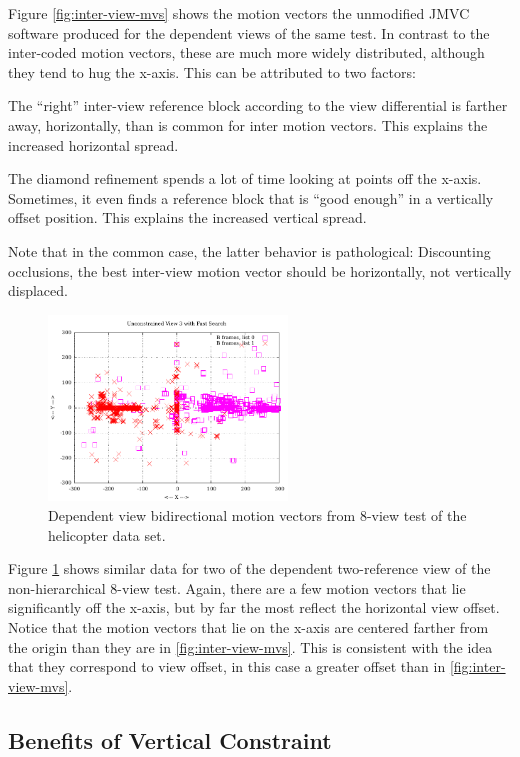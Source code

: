 \documentclass{sig-alternate-05-2015}
\begin{document}
Figure \ref{fig:inter-view-mvs} shows the motion vectors the unmodified JMVC
software produced for the dependent views of the same test. In contrast to the
inter-coded motion vectors, these are much more widely distributed, although
they tend to hug the x-axis. This can be attributed to two factors:
\begin{compactenum}
\item The ``right'' inter-view reference block according to the view
differential is farther away, horizontally, than is common for inter motion
vectors. This explains the increased horizontal spread.
\item The diamond refinement spends a lot of time looking at points off
the x-axis. Sometimes, it even finds a reference block that is ``good enough''
in a vertically offset position. This explains the increased vertical spread.
\end{compactenum} Note that in the common case, the latter behavior is
pathological: Discounting occlusions, the best inter-view motion vector should
be horizontally, not vertically displaced.

\begin{figure}[h]
\centering
\includegraphics[width=2.5in]{figures/helicopter-inter-view-bimvs1.pdf}
\caption{
Dependent view bidirectional motion vectors from 8-view test of the
helicopter data set.
}
\label{fig:inter-view-bimvs1}
\end{figure}

Figure \ref{fig:inter-view-bimvs1} shows similar data for two of the dependent
two-reference view of the non-hierarchical 8-view test. Again, there are a few
motion vectors that lie significantly off the x-axis, but by far the most
reflect the horizontal view offset. Notice that the motion vectors that lie on
the x-axis are centered farther from the origin than they are in
\ref{fig:inter-view-mvs}. This is consistent with the idea that they correspond
to view offset, in this case a greater offset than in \ref{fig:inter-view-mvs}.

\subsection{Benefits of Vertical Constraint} %
\label{subsec:constrained} %
\end{document}
